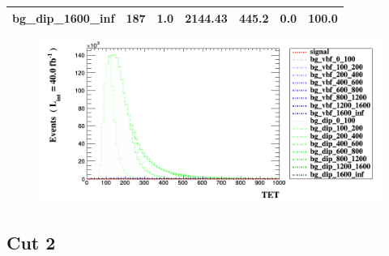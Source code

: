 \documentclass[a4paper, 10pt]{article}
\begin{document}
\begin{table}[H]
\begin{center}
\begin{tabular}{|m{23.0mm}|m{23.0mm}|m{18.0mm}|m{19.0mm}|m{19.0mm}|m{19.0mm}|m{19.0mm}|}
      \hline
      {\cellcolor{white}         bg\_dip\_1600\_inf}& {\cellcolor{white}         187}& {\cellcolor{white}         1.0}& {\cellcolor{white}         2144.43}& {\cellcolor{white}         445.2}& {\cellcolor{red}         0.0}& {\cellcolor{red}         100.0}\\
\hline
    \end{tabular}
  \end{center}
\end{table}

\begin{figure}[H]
  \begin{center}
    \includegraphics[scale=0.45]{selection_15.png}\\
\caption{   }
  \end{center}
\end{figure}
      \newpage
\subsection{Cut 2}
\end{document}
